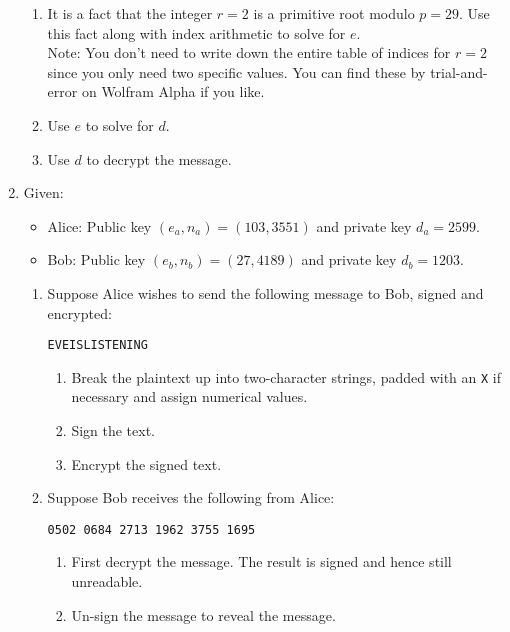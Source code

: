 \documentclass[class=article, crop=false]{standalone}
\begin{document}
\begin{enumerate}
\begin{enumerate}
		\item
			It is a fact that the integer $r=2$ is a primitive root modulo $p=29$.
			Use this fact along with index arithmetic to solve for $e$.
			\\Note: You don't need to write down
			the entire table of indices for $r=2$ since you only need two specific values.
			You can find these by trial-and-error on Wolfram Alpha if you like.
	
		\item
			Use $e$ to solve for $d$.
	
		\item
			Use $d$ to decrypt the message.
	
		\end{enumerate}
	
	\item
		Given:
		\begin{itemize}
		\item
			Alice: Public key $(e_a,n_a)=(103,3551)$ and private key $d_a=2599$.
		\item
			Bob: Public key $(e_b,n_b)=(27,4189)$ and private key $d_b=1203$.
		\end{itemize}
	
		\begin{enumerate}
	
		\item
			Suppose Alice wishes to send the following message to Bob,
			signed and encrypted:
			\begin{center}
				\texttt{EVEISLISTENING}
			\end{center}
			\begin{enumerate}
			\item
				Break the plaintext up into two-character strings,
				padded with an \texttt{X} if necessary and assign numerical values.
			\item
				Sign the text.
			\item
				Encrypt the signed text.
			\end{enumerate}
	
		\item Suppose Bob receives the following from Alice:
	
			\begin{center}
				\texttt{0502 0684 2713 1962 3755 1695}
			\end{center}
			\begin{enumerate}
			\item
				First decrypt the message.
				The result is signed and hence still unreadable.
			\item
				Un-sign the message to reveal the message.
			\end{enumerate}
	

\end{enumerate}
\end{enumerate}
\end{document}
